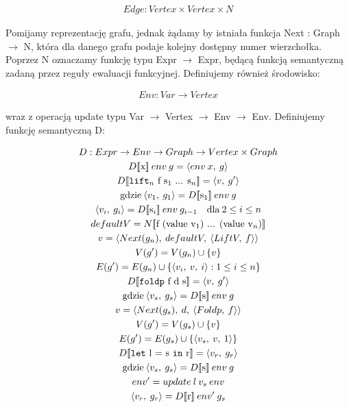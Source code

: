 \documentclass[11pt,leqno]{article}
\newcommand{\denote}[1]{\text{$[\![ $#1$ ]\!]$}}
\begin{document}
\begin{gather}
Edge : Vertex \times Vertex \times N
\end{gather}

Pomijamy reprezentację grafu, jednak żądamy by istniała funkcja Next : Graph $\rightarrow$ N, która dla danego grafu podaje kolejny dostępny numer wierzchołka. Poprzez N oznaczamy funkcję typu Expr $\rightarrow$ Expr, będącą funkcją semantyczną zadaną przez reguły ewaluacji funkcyjnej. Definiujemy również środowisko:

\begin{gather}
Env : Var \rightarrow Vertex  
\end{gather}

wraz z operacją update typu Var $\rightarrow$ Vertex $\rightarrow$ Env $\rightarrow$ Env. Definiujemy funkcję semantyczną D:

\begin {gather}
D : Expr \rightarrow Env \rightarrow Graph \rightarrow Vertex \times Graph \\  
D\denote{x}\:env\:g = \langle env\:x,\:g \rangle \\
D\denote{\texttt{lift$_{n}$} f s$_{1}$ ... s$_{n}$} = \langle v,\:g' \rangle \\
\text{gdzie} \: \langle v_{1},\:g_{1} \rangle = D\denote{s$_{1}$}\:env\:g \\
\langle v_{i},\:g_{i} \rangle = D\denote{s$_{i}$}\:env\:g_{i-1} \quad \text{dla}\:2 \leq i \leq n \\
defaultV = N\denote{f (value v$_{1}$) ... (value v$_{n}$)} \\
v = \langle Next(g_{n}),\:defaultV,\:\langle LiftV,\:f \rangle \rangle \\
V(g') = V(g_{n}) \cup \left\{ {v}\right\} \\
E(g') = E(g_{n}) \cup \{\langle v_{i},\:v,\:i \rangle : 1 \leq i \leq n\} \\
D\denote{\texttt{foldp} f d s} = \langle v,\:g' \rangle \\
\text{gdzie} \: \langle v_{s},\:g_{s} \rangle = D\denote{s}\:env\:g \\
v = \langle Next(g_{s}),\:d,\:\langle Foldp,\:f \rangle \rangle \\
V(g') = V(g_{s}) \cup \left\{ {v}\right\} \\
E(g') = E(g_{s}) \cup \{\langle v_{s},\:v,\:1 \rangle \} \\
D\denote{\texttt{let} l = s \texttt{in} r} = \langle v_{r},\:g_{r} \rangle \\
\text{gdzie} \: \langle v_{s},\:g_{s} \rangle = D\denote{s}\:env\:g \\
env' = update\:l\:v_{s}\:env \\
\langle v_{r},\:g_{r} \rangle = D\denote{r}\:env'\:g_{s}
\end{gather}
\end{document}
